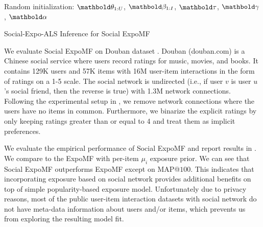 \begin{algorithm}
\DontPrintSemicolon %
Random initialization: $\mb\theta_{1:U}$, $\mb\beta_{1:I}$, $\mb\tau$, $\mb\gamma$, $\mb\alpha$\;
\;
\caption{{\sc Social-Expo-ALS} Inference for Social ExpoMF}
\label{chpt:expomf:algo:social_expomf}
\end{algorithm}

 We evaluate Social ExpoMF on Douban dataset \citep{ma2011recommender}. Douban (douban.com) is a Chinese social service where users
record ratings for music, movies, and books. It contains 129K users and 57K items with 16M user-item interactions in the form of ratings on a 1-5 scale. The social network is undirected (i.e., if user $v$ is user $u$'s social friend, then the reverse is true) with 1.3M network connections. Following the experimental setup in \citet{chaney2015probabilistic}, we remove network connections where the users have no items in common. Furthermore, we binarize the explicit ratings by only keeping ratings greater than or equal to 4 and treat them as implicit preferences. 

 We evaluate the empirical performance of Social ExpoMF and report results in . We compare to the ExpoMF with per-item $\mu_i$ exposure prior. We can see that Social ExpoMF outperforms ExpoMF except on MAP@$100$. This indicates that incorporating exposure based on social network provides additional benefits on top of simple popularity-based exposure model. Unfortunately due to privacy reasons, most of the public user-item interaction datasets with social network do not have meta-data information about users and/or items, which prevents us from exploring the resulting model fit.   

